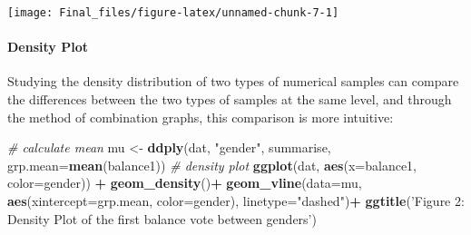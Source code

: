 \documentclass[
]{article}
\newenvironment{Shaded}{\begin{snugshade}}{\end{snugshade}}
\newcommand{\CommentTok}[1]{\textcolor[rgb]{0.56,0.35,0.01}{\textit{#1}}}
\newcommand{\DataTypeTok}[1]{\textcolor[rgb]{0.13,0.29,0.53}{#1}}
\newcommand{\KeywordTok}[1]{\textcolor[rgb]{0.13,0.29,0.53}{\textbf{#1}}}
\newcommand{\NormalTok}[1]{#1}
\newcommand{\OperatorTok}[1]{\textcolor[rgb]{0.81,0.36,0.00}{\textbf{#1}}}
\newcommand{\StringTok}[1]{\textcolor[rgb]{0.31,0.60,0.02}{#1}}
\begin{document}
\begin{Shaded}
\end{Shaded}

\begin{center}\texttt{[image: Final\_files/figure-latex/unnamed-chunk-7-1]} \end{center}

\hypertarget{density-plot}{%
\paragraph{Density Plot}\label{density-plot}}

Studying the density distribution of two types of numerical samples can
compare the differences between the two types of samples at the same
level, and through the method of combination graphs, this comparison is
more intuitive:

\begin{Shaded}
\begin{Highlighting}[]
\CommentTok{# calculate mean}
\NormalTok{mu <-}\StringTok{ }\KeywordTok{ddply}\NormalTok{(dat, }\StringTok{"gender"}\NormalTok{, summarise, }\DataTypeTok{grp.mean=}\KeywordTok{mean}\NormalTok{(balance1))}
\CommentTok{# density plot}
\KeywordTok{ggplot}\NormalTok{(dat, }\KeywordTok{aes}\NormalTok{(}\DataTypeTok{x=}\NormalTok{balance1, }\DataTypeTok{color=}\NormalTok{gender)) }\OperatorTok{+}
\StringTok{  }\KeywordTok{geom_density}\NormalTok{()}\OperatorTok{+}
\StringTok{  }\KeywordTok{geom_vline}\NormalTok{(}\DataTypeTok{data=}\NormalTok{mu, }\KeywordTok{aes}\NormalTok{(}\DataTypeTok{xintercept=}\NormalTok{grp.mean, }\DataTypeTok{color=}\NormalTok{gender),}
             \DataTypeTok{linetype=}\StringTok{"dashed"}\NormalTok{)}\OperatorTok{+}
\StringTok{  }\KeywordTok{ggtitle}\NormalTok{(}\StringTok{'Figure 2: Density Plot of the first balance vote between genders'}\NormalTok{)}
\end{Highlighting}
\end{Shaded}
\end{document}
